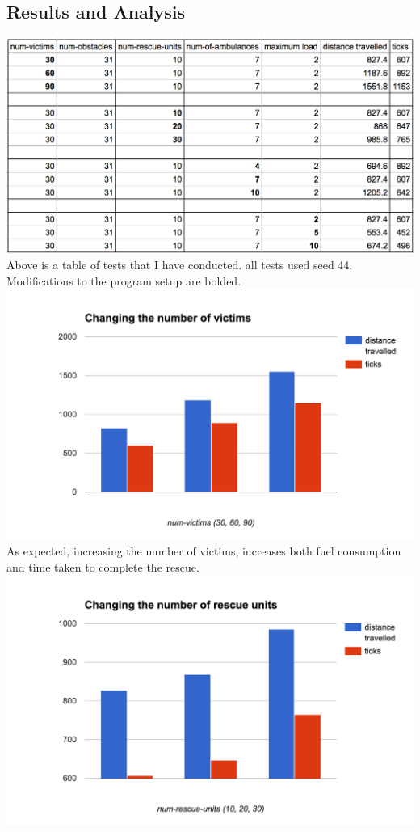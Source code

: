 \documentclass[titlepage]{article}
\begin{document}
  \subsection{Results and Analysis}
    \includegraphics[width=\textwidth,height=\textheight,keepaspectratio]{1table.png}
    \\
    Above is a table of tests that I have conducted. all tests used seed 44. Modifications to the program setup are bolded.
    \\
    \includegraphics[width=\textwidth,height=\textheight,keepaspectratio]{1victims.png}
    \\
    As expected, increasing the number of victims, increases both fuel consumption and time taken to complete the rescue.
    \\
    \includegraphics[width=\textwidth,height=\textheight,keepaspectratio]{1rescueunits.png}
\end{document}
